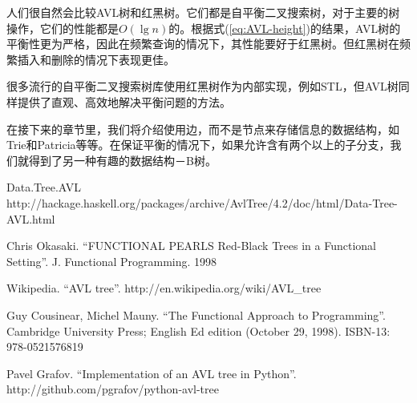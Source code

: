 \documentclass[UTF8]{article}
\begin{document}
人们很自然会比较AVL树和红黑树。它们都是自平衡二叉搜索树，对于主要的树操作，它们的性能都是$O(\lg n)$的。根据式(\ref{eq:AVL-height})的结果，AVL树的平衡性更为严格，因此在频繁查询的情况下，其性能要好于红黑树\cite{wiki}。但红黑树在频繁插入和删除的情况下表现更佳。

很多流行的自平衡二叉搜索树库使用红黑树作为内部实现，例如STL，但AVL树同样提供了直观、高效地解决平衡问题的方法。

在接下来的章节里，我们将介绍使用边，而不是节点来存储信息的数据结构，如Trie和Patricia等等。在保证平衡的情况下，如果允许含有两个以上的子分支，我们就得到了另一种有趣的数据结构－B树。

\begin{thebibliography}{99}

Data.Tree.AVL http://hackage.haskell.org/packages/archive/AvlTree/4.2/doc/html/Data-Tree-AVL.html

Chris Okasaki. ``FUNCTIONAL PEARLS Red-Black Trees in a Functional Setting''. J. Functional Programming. 1998

Wikipedia. ``AVL tree''. http://en.wikipedia.org/wiki/AVL\_tree

Guy Cousinear, Michel Mauny. ``The Functional Approach to Programming''. Cambridge University Press; English Ed edition (October 29, 1998). ISBN-13: 978-0521576819

Pavel Grafov. ``Implementation of an AVL tree in Python''. http://github.com/pgrafov/python-avl-tree
\end{thebibliography}

\ifx\wholebook\relax\else
\end{document}
